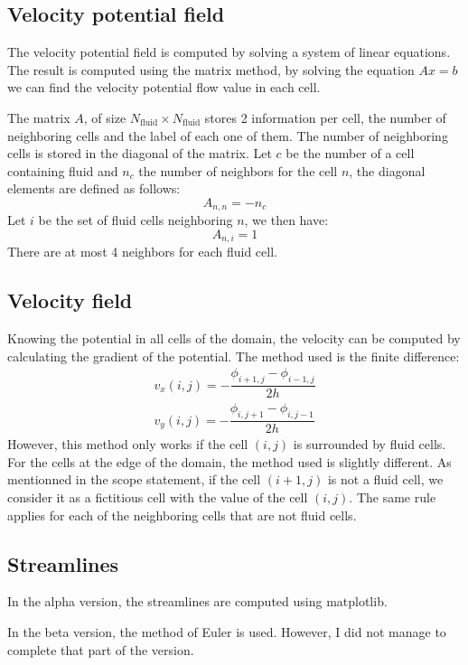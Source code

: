 \subsection{Velocity potential field}
The velocity potential field is computed by solving a system of linear
equations. The result is computed using the matrix method, by solving the
equation $Ax = b$ we can find the velocity potential flow value in each cell.

The matrix $A$, of size $N_\text{fluid} \times N_\text{fluid}$ stores 2
information per cell, the number of neighboring cells and the label of each
one of them. The number of neighboring cells is stored in the diagonal of the
 matrix. Let $c$ be the number of a cell containing fluid and $n_c$ the number
 of neighbors for the cell $n$, the diagonal elements are defined as follows:
\[
      A_{n, n} = -n_c
\]
Let $i$ be the set of fluid cells neighboring $n$, we then have:
\[
      A_{n, i} = 1
\]
There are at most 4 neighbors for each fluid cell.

\subsection{Velocity field}
Knowing the potential in all cells of the domain, the velocity can be computed
by calculating the gradient of the potential.
The method used is the finite difference:
\[
      \begin{array}{c}
            v_x(i, j) = - \dfrac{\phi_{i+1, j} - \phi_{i-1, j}}{2h}\\
            v_y(i, j) = - \dfrac{\phi_{i, j+1} - \phi_{i, j-1}}{2h}
      \end{array}
\]
However, this method only works if the cell $(i, j)$ is surrounded by fluid
cells. For the cells at the edge of the domain, the method used is slightly
different. As mentionned in the scope statement\cite{scope-statement}, if the
cell $(i+1, j)$ is not a fluid cell, we consider it as a fictitious cell with
the value of the cell $(i, j)$. The same rule applies for each of the
neighboring cells that are not fluid cells.

\subsection{Streamlines}
In the alpha version, the streamlines are computed using matplotlib.

In the beta version, the method of Euler is used. However, I did not manage to
complete that part of the version.

